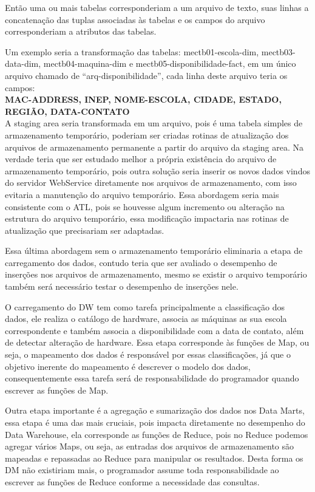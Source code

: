 \documentclass[a4paper,12pt]{article}
\begin{document}
Então uma ou mais tabelas corresponderiam a um arquivo de texto, suas linhas a
concatenação das tuplas associadas às tabelas e os campos do arquivo
corresponderiam a atributos das tabelas.

Um exemplo seria a transformação das tabelas: mectb01-escola-dim,
mectb03-data-dim, mectb04-maquina-dim e mectb05-disponibilidade-fact, em um
único arquivo chamado de “arq-disponibilidade”, cada linha deste arquivo teria
os campos:\\

\textbf{MAC-ADDRESS, INEP, NOME-ESCOLA, CIDADE, ESTADO, REGIÃO, DATA-CONTATO}\\

A staging area seria transformada em um arquivo, pois é uma tabela simples de
armazenamento temporário, poderiam ser criadas rotinas de atualização dos
arquivos de armazenamento permanente a partir do arquivo da staging area. Na
verdade teria que ser estudado melhor a própria existência do arquivo de
armazenamento temporário, pois outra solução seria inserir os novos dados vindos
do servidor WebService diretamente nos arquivos de armazenamento, com isso
evitaria a manutenção do arquivo temporário. Essa abordagem seria mais
consistente com o ATL, pois se houvesse algum incremento ou alteração na
estrutura do arquivo temporário, essa modificação impactaria nas rotinas de
atualização que precisariam ser adaptadas.
 
Essa última abordagem sem o armazenamento temporário eliminaria a etapa de
carregamento dos dados, contudo teria que ser avaliado o desempenho de inserções
nos arquivos de armazenamento, mesmo se existir o arquivo temporário também será
necessário testar o desempenho de inserções nele.

O carregamento do DW tem como tarefa principalmente a classificação dos dados,
ele realiza o catálogo de hardware, associa as máquinas as sua escola
correspondente e também associa a disponibilidade com a data de contato, além de
detectar alteração de hardware. Essa etapa corresponde às funções de Map, ou
seja, o mapeamento dos dados é responsável por essas classificações, já que o
objetivo inerente do mapeamento é descrever o modelo dos dados, consequentemente
essa tarefa será de responsabilidade do programador quando escrever as funções
de Map.

Outra etapa importante é a agregação e sumarização dos dados nos Data Marts,
essa etapa é uma das mais cruciais, pois impacta diretamente no desempenho do
Data Warehouse, ela corresponde as funções de Reduce, pois no Reduce podemos
agregar vários Maps, ou seja, as entradas dos arquivos de armazenamento são
mapeadas e repassadas ao Reduce para manipular os resultados. Desta forma os DM
não existiriam mais, o programador assume toda responsabilidade ao escrever as
funções de Reduce conforme a necessidade das consultas.
\end{document}
